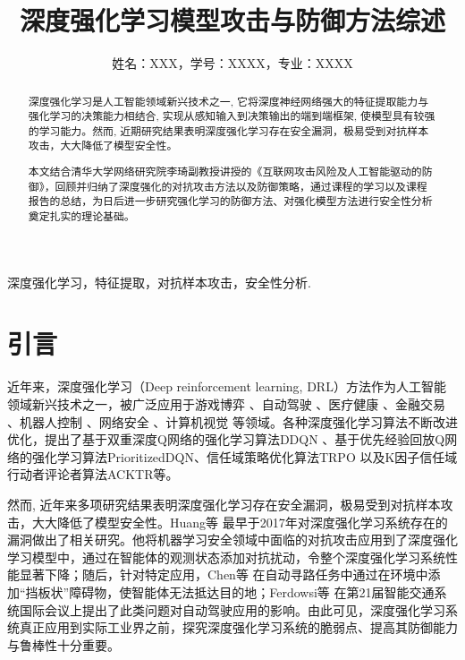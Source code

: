 \documentclass[lettersize,journal]{IEEEtran}
\begin{document}
\title{深度强化学习模型攻击与防御方法综述}


\author{姓名：XXX，学号：XXXX，专业：XXXX}




\maketitle

\begin{abstract}
深度强化学习是人工智能领域新兴技术之一, 它将深度神经网络强大的特征提取能力与强化学习的决策能力相结合, 实现从感知输入到决策输出的端到端框架, 使模型具有较强的学习能力。然而, 近期研究结果表明深度强化学习存在安全漏洞，极易受到对抗样本攻击，大大降低了模型安全性。

本文结合清华大学网络研究院李琦副教授讲授的《互联网攻击风险及人工智能驱动的防御》，回顾并归纳了深度强化的对抗攻击方法以及防御策略，通过课程的学习以及课程报告的总结，为日后进一步研究强化学习的防御方法、对强化模型方法进行安全性分析奠定扎实的理论基础。
\end{abstract}

\begin{IEEEkeywords}
深度强化学习，特征提取，对抗样本攻击，安全性分析.
\end{IEEEkeywords}



\section*{引言}
\quad 近年来，深度强化学习（Deep reinforcement learning, DRL）方法作为人工智能领域新兴技术之一，被广泛应用于游戏博弈\cite{silver2016mastering} 、自动驾驶\cite{fayjie2018driverless} 、医疗健康\cite{prasad2017reinforcement} 、金融交易\cite{deng2016deep} 、机器人控制\cite{amarjyoti2017deep} 、网络安全\cite{nguyen2021deep} 、计算机视觉\cite{oh2015action} 等领域。各种深度强化学习算法不断改进优化，提出了基于双重深度Q网络的强化学习算法DDQN\cite{mnih2013playing} 、基于优先经验回放Q网络的强化学习算法PrioritizedDQN、信任域策略优化算法TRPO\cite{schulman2015trust} 以及K因子信任域行动者评论者算法ACKTR\cite{wu2017scalable}等。

\quad 然而, 近年来多项研究结果表明深度强化学习存在安全漏洞，极易受到对抗样本攻击，大大降低了模型安全性。Huang等\cite{huang2017adversarial} 最早于2017年对深度强化学习系统存在的漏洞做出了相关研究。他将机器学习安全领域中面临的对抗攻击应用到了深度强化学习模型中，通过在智能体的观测状态添加对抗扰动，令整个深度强化学习系统性能显著下降；随后，针对特定应用，Chen等\cite{chen2018gradient} 在自动寻路任务中通过在环境中添加“挡板状”障碍物，使智能体无法抵达目的地；Ferdowsi等\cite{ferdowsi2018robust} 在第21届智能交通系统国际会议上提出了此类问题对自动驾驶应用的影响。由此可见，深度强化学习系统真正应用到实际工业界之前，探究深度强化学习系统的脆弱点、提高其防御能力与鲁棒性十分重要。
\end{document}
